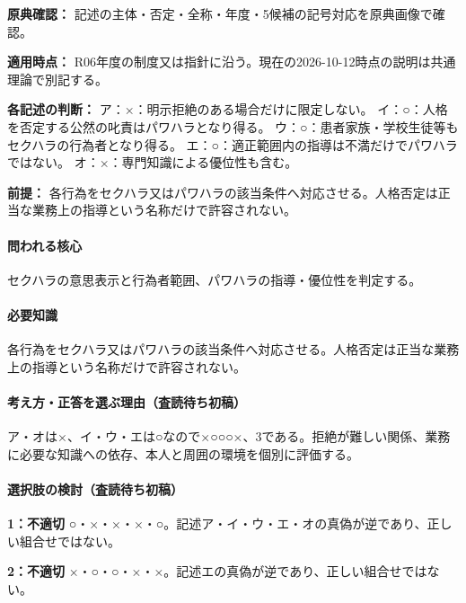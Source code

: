\noindent\textbf{原典確認：} 記述の主体・否定・全称・年度・5候補の記号対応を原典画像で確認。\par

\noindent\textbf{適用時点：} R06年度の制度又は指針に沿う。現在の2026-10-12時点の説明は共通理論で別記する。\par

\noindent\textbf{各記述の判断：} ア：×：明示拒絶のある場合だけに限定しない。 イ：○：人格を否定する公然の叱責はパワハラとなり得る。 ウ：○：患者家族・学校生徒等もセクハラの行為者となり得る。 エ：○：適正範囲内の指導は不満だけでパワハラではない。 オ：×：専門知識による優位性も含む。\par

\noindent\textbf{前提：} 各行為をセクハラ又はパワハラの該当条件へ対応させる。人格否定は正当な業務上の指導という名称だけで許容されない。\par

\paragraph{問われる核心} セクハラの意思表示と行為者範囲、パワハラの指導・優位性を判定する。

\paragraph{必要知識} 各行為をセクハラ又はパワハラの該当条件へ対応させる。人格否定は正当な業務上の指導という名称だけで許容されない。

\paragraph{考え方・正答を選ぶ理由（査読待ち初稿）} ア・オは×、イ・ウ・エは○なので×○○○×、3である。拒絶が難しい関係、業務に必要な知識への依存、本人と周囲の環境を個別に評価する。

\paragraph{選択肢の検討（査読待ち初稿）}\mbox{}\par

\noindent\textbf{1：不適切} ○・×・×・×・○。記述ア・イ・ウ・エ・オの真偽が逆であり、正しい組合せではない。\par

\noindent\textbf{2：不適切} ×・○・○・×・×。記述エの真偽が逆であり、正しい組合せではない。\par

